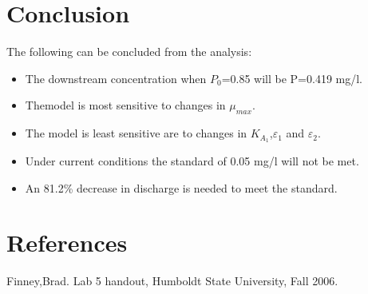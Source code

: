 \documentclass[titlepage,11pt]{article}
\begin{document}
\newpage
\section{Conclusion}
The following can be concluded from the analysis:
\begin{itemize}
\item{The downstream concentration when $P_0$=0.85 will be P=0.419 mg/l.}
\item{Themodel is most sensitive to changes in $\mu_{max}$.}
\item{The model is least sensitive are to changes in
$K_{A_1}$,$\varepsilon_1$ and $\varepsilon_2$.}
\item{Under current conditions the standard of 0.05 mg/l will not be met.}
\item{An 81.2\% decrease in discharge is needed to meet the
standard.}
\end{itemize}

\section{References}
\noindent Finney,Brad. Lab 5 handout, Humboldt State University,
Fall 2006.
\end{document}

